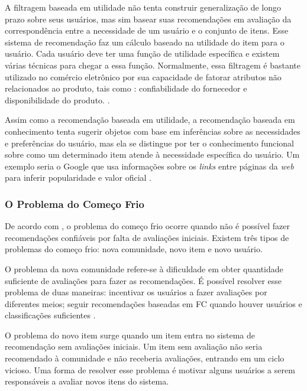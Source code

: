 
A filtragem baseada em utilidade não tenta construir generalização de longo prazo sobre seus usuários, mas sim basear suas recomendações 
em avaliação da correspondência entre a necessidade de um usuário e o conjunto de itens.
Esse sistema de recomendação faz um cálculo baseado na utilidade do item para o usuário.
Cada usuário deve ter uma função de utilidade específica e existem várias técnicas para chegar a essa função. Normalmente, essa filtragem é bastante utilizado no comércio eletrônico por sua capacidade de fatorar atributos não relacionados ao produto, tais como :
confiabilidade do fornecedor e disponibilidade do produto. \cite{burke2002}.


Assim como a recomendação baseada em utilidade, a recomendação baseada em conhecimento tenta sugerir objetos com base em inferências
sobre as necessidades e preferências do usuário, mas ela se distingue por ter o conhecimento funcional sobre 
como um determinado item atende à necessidade específica do usuário. Um exemplo seria 
o Google que usa informações sobre os \emph{links} entre páginas da \emph{web} para inferir popularidade e valor oficial \cite{burke2002}.


\subsubsection{O Problema do Começo Frio}

De acordo com , o problema do começo frio ocorre quando não é possível fazer recomendações 
confiáveis por falta de avaliações iniciais. Existem três tipos de problemas do começo frio: nova comunidade, novo item e novo usuário. 

O problema da nova comunidade refere-se à dificuldade em obter quantidade suficiente de avaliações para fazer as recomendações. É possível 
resolver esse problema de duas maneiras: incentivar os usuários a fazer avaliações por diferentes meios; seguir recomendações baseadas em FC 
quando houver usuários e classificações suficientes \cite{bobadilla2013}.

O problema do novo item surge quando um item entra no sistema de recomendação sem avaliações iniciais. 
Um item sem avaliação não seria recomendado à comunidade e não receberia avaliações, entrando em um ciclo vicioso. Uma forma 
de resolver esse problema é motivar alguns usuários a serem responsáveis a avaliar novos itens do sistema\cite{burke2002}. 

